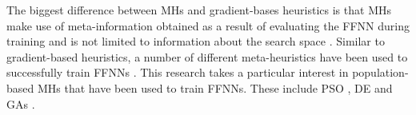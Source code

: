 The biggest difference between \acp{MH} and gradient-bases heuristics is that
\acp{MH} make use of meta-information obtained as a result of evaluating the \acs{FFNN} during training and is not limited to information about the search space \cite{ref:blum:2003}. Similar to gradient-based heuristics, a number of different meta-heuristics have been used to successfully train \acp{FFNN} \cite{ref:rakitianskaia:2012, ref:vanwyk:2014, ref:gupta:1999}. This research takes a particular interest in population-based \acp{MH} that have been used to train \acp{FFNN}. These include \acf{PSO} \cite{ref:shi:1998}, \acf{DE} \cite{ref:price:2006} and \acfp{GA} \cite{ref:fraser:1957}.
